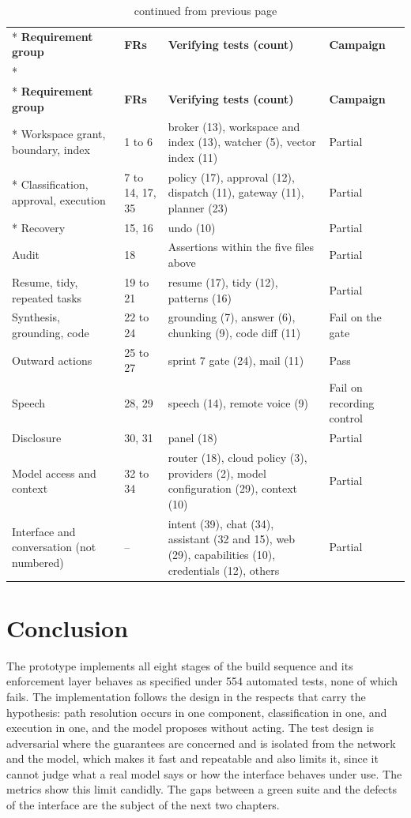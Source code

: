 \documentclass{FastFyp}
\begin{document}
{
\begin{longtable}{|p{4.2cm}|p{1.6cm}|p{4.9cm}|p{2.5cm}|}
\caption{Requirements traceability.}\label{tab:trace}\\*
\hline
\textbf{Requirement group} & \textbf{FRs} & \textbf{Verifying tests (count)} & \textbf{Campaign} \\*
\hline
\endfirsthead
\caption[]{continued from previous page}\\*
\hline
\textbf{Requirement group} & \textbf{FRs} & \textbf{Verifying tests (count)} & \textbf{Campaign} \\*
\hline
\endhead
\hline
Workspace grant, boundary, index & 1 to 6 & broker (13), workspace and index (13), watcher (5), vector index (11) & Partial \\*
\hline
Classification, approval, execution & 7 to 14, 17, 35 & policy (17), approval (12), dispatch (11), gateway (11), planner (23) & Partial \\*
\hline
Recovery & 15, 16 & undo (10) & Partial \\
\hline
Audit & 18 & Assertions within the five files above & Partial \\
\hline
Resume, tidy, repeated tasks & 19 to 21 & resume (17), tidy (12), patterns (16) & Partial \\
\hline
Synthesis, grounding, code & 22 to 24 & grounding (7), answer (6), chunking (9), code diff (11) & Fail on the gate \\
\hline
Outward actions & 25 to 27 & sprint 7 gate (24), mail (11) & Pass \\
\hline
Speech & 28, 29 & speech (14), remote voice (9) & Fail on recording control \\
\hline
Disclosure & 30, 31 & panel (18) & Partial \\
\hline
Model access and context & 32 to 34 & router (18), cloud policy (3), providers (2), model configuration (29), context (10) & Partial \\
\hline
Interface and conversation (not numbered) & -- & intent (39), chat (34), assistant (32 and 15), web (29), capabilities (10), credentials (12), others & Partial \\
\hline
\end{longtable}
}

\section{Conclusion}
The prototype implements all eight stages of the build sequence and its enforcement layer behaves as specified under 554 automated tests, none of which fails. The implementation follows the design in the respects that carry the hypothesis: path resolution occurs in one component, classification in one, and execution in one, and the model proposes without acting. The test design is adversarial where the guarantees are concerned and is isolated from the network and the model, which makes it fast and repeatable and also limits it, since it cannot judge what a real model says or how the interface behaves under use. The metrics show this limit candidly. The gaps between a green suite and the defects of the interface are the subject of the next two chapters.
\end{document}
